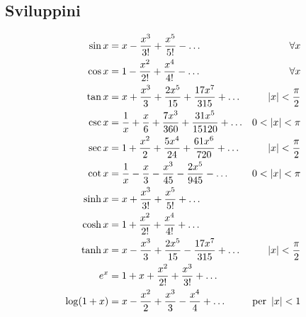 \documentclass[10pt,a4paper]{article}
\begin{document}
\begin{multicols}{2}
  \section*{Sviluppini}
  \begin{align*}
    \sin x       & = x - \frac{x^3}{3!} + \frac{x^5}{5!} - \ldots                                & \forall x               \\
    \cos x       & = 1 - \frac{x^2}{2!} + \frac{x^4}{4!} - \ldots                                & \forall x               \\
    \tan x       & = x + \frac{x^3}{3} + \frac{2x^5}{15} + \frac{17x^7}{315} + \ldots            & \left|{x}\right| < \frac{\pi}{2} \\
    \csc x       & = \frac{1}{x} + \frac{x}{6} + \frac{7x^3}{360} + \frac{31x^5}{15120} + \ldots & 0 < \left|{x}\right| < \pi       \\
    \sec x       & = 1 + \frac{x^2}{2} + \frac{5x^4}{24} + \frac{61x^6}{720} + \ldots            & \left|{x}\right| < \frac{\pi}{2} \\
    \cot x       & = \frac{1}{x} - \frac{x}{3} - \frac{x^3}{45} - \frac{2x^5}{945} - \ldots      & 0 < \left|{x}\right| < \pi       \\
    \sinh x      & = x + \frac{x^3}{3!} + \frac{x^5}{5!} + \ldots                                &                         \\
    \cosh x      & = 1 + \frac{x^2}{2!} + \frac{x^4}{4!} + \ldots                                &                         \\
    \tanh x      & = x - \frac{x^3}{3} + \frac{2x^5}{15} - \frac{17 x^7}{315} + \ldots           & \left|{x}\right| < \frac{\pi}{2} \\
    e^x          & = 1 + x + \frac{x^2}{2!} + \frac{x^3}{3!} + \ldots                            &                         \\
    \log (1 + x) & = x - \frac{x^2}{2} + \frac{x^3}{3} - \frac{x^4}{4} + \ldots                  & \text{per } \left|{x}\right| < 1 \\
  \end{align*}
\end{multicols}
\end{document}
